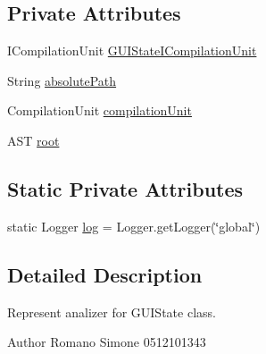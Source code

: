 \subsection*{Private Attributes}
\begin{DoxyCompactItemize}
\item 
I\-Compilation\-Unit \hyperlink{classit_1_1isislab_1_1masonhelperdocumentation_1_1analizer_1_1_g_u_i_state_analizer_a8f27dabd9393f0cfd0e04a7217f63641}{G\-U\-I\-State\-I\-Compilation\-Unit}
\item 
String \hyperlink{classit_1_1isislab_1_1masonhelperdocumentation_1_1analizer_1_1_g_u_i_state_analizer_a3bc098c874b3b4edec5a5638f7505195}{absolute\-Path}
\item 
Compilation\-Unit \hyperlink{classit_1_1isislab_1_1masonhelperdocumentation_1_1analizer_1_1_g_u_i_state_analizer_a982a034abbb89787ae4faab516720c32}{compilation\-Unit}
\item 
A\-S\-T \hyperlink{classit_1_1isislab_1_1masonhelperdocumentation_1_1analizer_1_1_g_u_i_state_analizer_aef3b13094b99816005f5993cf73e7d43}{root}
\end{DoxyCompactItemize}
\subsection*{Static Private Attributes}
\begin{DoxyCompactItemize}
\item 
static Logger \hyperlink{classit_1_1isislab_1_1masonhelperdocumentation_1_1analizer_1_1_g_u_i_state_analizer_abfa6779bca8bb8d68bd379cc28da4800}{log} = Logger.\-get\-Logger(\char`\"{}global\char`\"{})
\end{DoxyCompactItemize}


\subsection{Detailed Description}
Represent analizer for G\-U\-I\-State class. \begin{DoxyAuthor}{Author}
Romano Simone 0512101343 
\end{DoxyAuthor}


